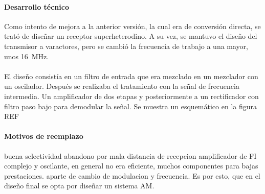 \paragraph{Desarrollo técnico}
Como intento de mejora a la anterior versión, la cual era de conversión directa, se trató de diseñar un receptor superheterodino. A su vez, se mantuvo el diseño del transmisor a varactores, pero se cambió la frecuencia de trabajo a una mayor, unos \SI{16}{\mega\hertz}. 
\paragraph{}
El diseño consistía en un filtro de entrada que era mezclado en un mezclador con un oscilador. Después se realizaba el tratamiento con la señal de frecuencia intermedia. Un amplificador de dos etapas y posteriormente a un rectificador con filtro paso bajo para demodular la señal. Se muestra un esquemático en la figura REF

\paragraph{Motivos de reemplazo}
buena selectividad
abandono por mala distancia de recepcion amplificador de FI complejo y oscilante, en general no era eficiente, muchos componentes para bajas prestaciones. aparte de cambio de modulacion y frecuencia. 
Es por esto, que en el diseño final se opta por diseñar un sistema AM.
